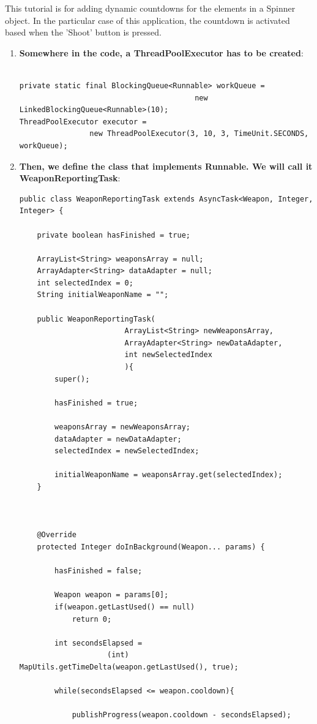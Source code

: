 \documentclass{article}
\begin{document}
This tutorial is for adding dynamic countdowns for the elements in a Spinner
object. In the particular case of this application, the countdown is activated
based when the 'Shoot' button is pressed.\newline
\begin{enumerate}
  \item \textbf{Somewhere in the code, a ThreadPoolExecutor has to be created}:
  
\begin{verbatim}

private static final BlockingQueue<Runnable> workQueue = 
										new LinkedBlockingQueue<Runnable>(10);
ThreadPoolExecutor executor = 
				new ThreadPoolExecutor(3, 10, 3, TimeUnit.SECONDS, workQueue);
\end{verbatim}
	
  \item \textbf{Then, we define the class that implements Runnable. We will call
  it WeaponReportingTask}:

\begin{verbatim}
public class WeaponReportingTask extends AsyncTask<Weapon, Integer, Integer> {	
  		
	private boolean hasFinished = true;
	
	ArrayList<String> weaponsArray = null;
	ArrayAdapter<String> dataAdapter = null;
	int selectedIndex = 0;
	String initialWeaponName = "";	
	
	public WeaponReportingTask(
						ArrayList<String> newWeaponsArray, 
						ArrayAdapter<String> newDataAdapter,
						int newSelectedIndex
						){		
		super();
		
		hasFinished = true;
		
		weaponsArray = newWeaponsArray;
		dataAdapter = newDataAdapter;
		selectedIndex = newSelectedIndex;
		
		initialWeaponName = weaponsArray.get(selectedIndex);
	}
	
	

	@Override
 	protected Integer doInBackground(Weapon... params) {
	
		hasFinished = false;
		
		Weapon weapon = params[0];
 		if(weapon.getLastUsed() == null) 
 			return 0;
 		
 		int secondsElapsed = 
 					(int) MapUtils.getTimeDelta(weapon.getLastUsed(), true);
 		
 		while(secondsElapsed <= weapon.cooldown){
 			
 			publishProgress(weapon.cooldown - secondsElapsed);
 			

\end{verbatim}
\end{enumerate}
\end{document}
